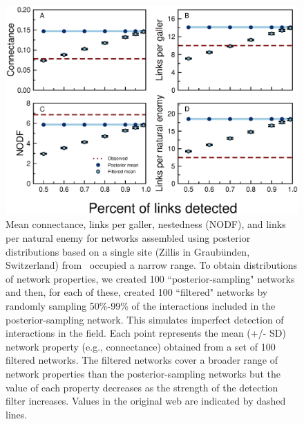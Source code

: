 \documentclass[12pt]{article}
\begin{document}
  \begin{figure}[h!]
    \caption{Mean connectance, links per galler, nestedness (NODF), and links per natural enemy for networks assembled using posterior distributions based on a single site (Zillis in Graub\"{u}nden, Switzerland) from~\citet{Kopelke2017} occupied a narrow range. To obtain distributions of network properties, we created 100 ``posterior-sampling" networks and then, for each of these, created 100 ``filtered" networks by randomly sampling 50\%-99\% of the interactions included in the posterior-sampling network. This simulates imperfect detection of interactions in the field. Each point represents the mean (+/- SD) network property (e.g., connectance) obtained from a set of 100 filtered networks. The filtered networks cover a broader range of network properties than the posterior-sampling networks but the value of each property decreases as the strength of the detection filter increases. Values in the original web are indicated by dashed lines.}
    \label{posterior_webs}    
    \begin{center}
    \includegraphics[width=.8\textwidth]{figures/GP_posterior_properties_Zillis.eps}
    \end{center}
    \end{figure}


\clearpage

     
\end{document}
